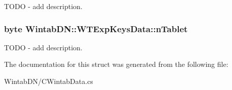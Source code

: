 TODO -\/ add description. 

\hypertarget{struct_wintab_d_n_1_1_w_t_exp_keys_data_a9672ec46f24431011506221a0907b9f1}{
\subsubsection[{nTablet}]{\setlength{\rightskip}{0pt plus 5cm}byte {\bf WintabDN::WTExpKeysData::nTablet}}}
\label{struct_wintab_d_n_1_1_w_t_exp_keys_data_a9672ec46f24431011506221a0907b9f1}


TODO -\/ add description. 



The documentation for this struct was generated from the following file:\begin{DoxyCompactItemize}
\item 
WintabDN/CWintabData.cs\end{DoxyCompactItemize}
